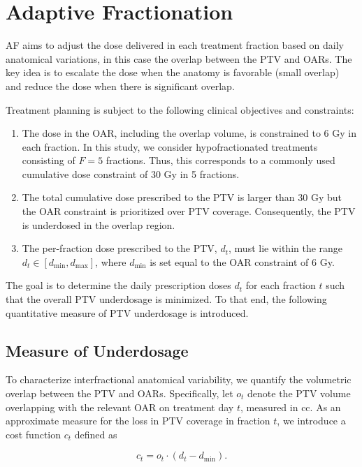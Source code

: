 \documentclass[11pt]{article}
\begin{document}
\section{Adaptive Fractionation}

AF aims to adjust the dose delivered in each treatment fraction based on daily anatomical variations, in this case the overlap between the PTV and OARs. The key idea is to escalate the dose when the anatomy is favorable (small overlap) and reduce the dose when there is significant overlap.

Treatment planning is subject to the following clinical objectives and constraints:

\begin{enumerate}
\item The dose in the OAR, including the overlap volume, is constrained to 6 Gy in each fraction. In this study, we consider hypofractionated treatments consisting of $F=5$ fractions. Thus, this corresponds to a commonly used cumulative dose constraint of 30 Gy in 5 fractions.
\item The total cumulative dose prescribed to the PTV is larger than 30 Gy but the OAR constraint is prioritized over PTV coverage. Consequently, the PTV is underdosed in the overlap region.
\item The per-fraction dose prescribed to the PTV, $d_t$, must lie within the range $d_t \in [d_{\min}, d_{\max}]$, where $d_{\min}$ is set equal to the OAR constraint of 6 Gy.
\end{enumerate}

The goal is to determine the daily prescription doses $d_t$ for each fraction $t$ such that the overall PTV underdosage is minimized. To that end, the following quantitative measure of PTV underdosage is introduced.

\subsection{Measure of Underdosage}

To characterize interfractional anatomical variability, we quantify the volumetric overlap between the PTV and OARs. Specifically, let $o_t$ denote the PTV volume overlapping with the relevant OAR on treatment day $t$, measured in cc. As an approximate measure for the loss in PTV coverage in fraction $t$, we introduce a cost function $c_t$ defined as

\begin{equation}
c_t = o_t \cdot (d_t - d_{\min}).
\label{eq:underdosage-cost}
\end{equation}
\end{document}
